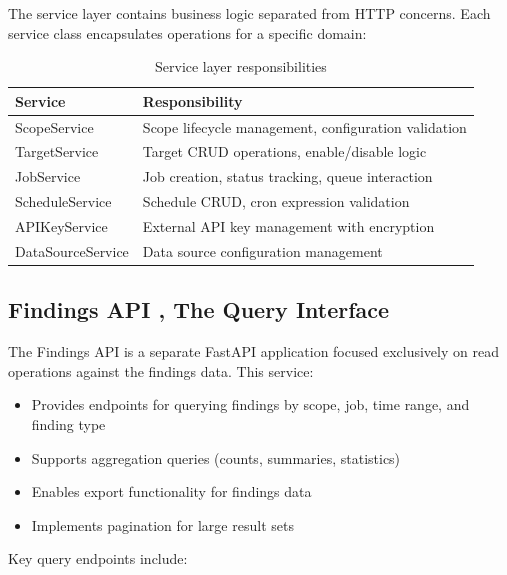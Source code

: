 \documentclass[a4paper,12pt]{report}
\begin{document}
The service layer contains business logic separated from HTTP concerns. Each service class encapsulates operations for a specific domain:\hfill \break

\begin{table}[H]
\centering
\caption{Service layer responsibilities}
\begin{tabular}{|l|l|}
\hline
\textbf{Service} & \textbf{Responsibility} \\
\hline
ScopeService & Scope lifecycle management, configuration validation \\
\hline
TargetService & Target CRUD operations, enable/disable logic \\
\hline
JobService & Job creation, status tracking, queue interaction \\
\hline
ScheduleService & Schedule CRUD, cron expression validation \\
\hline
APIKeyService & External API key management with encryption \\
\hline
DataSourceService & Data source configuration management \\
\hline
\end{tabular}
\label{tab:services}
\end{table}

\subsection{Findings API ,  The Query Interface}

The Findings API is a separate FastAPI application focused exclusively on read operations against the findings data. This service:\hfill

\begin{itemize}
\item Provides endpoints for querying findings by scope, job, time range, and finding type
\item Supports aggregation queries (counts, summaries, statistics)
\item Enables export functionality for findings data
\item Implements pagination for large result sets
\end{itemize}

Key query endpoints include:\hfill \break
\end{document}
